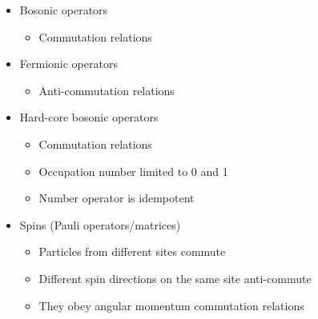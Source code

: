 \begin{frame}[t]
        \begin{minipage}[t]{0.5\textwidth}
            \vspace{0pt}
            \begin{itemize}
                \item Bosonic operators
                \begin{itemize}
                    \item Commutation relations
                \end{itemize}
                \item Fermionic operators
                \begin{itemize}
                    \item Anti-commutation relations
                \end{itemize}
                \item Hard-core bosonic operators
                \begin{itemize}
                    \item Commutation relations
                    \item Occupation number limited to 0 and 1
                    \item Number operator is idempotent
                \end{itemize}
                \item Spins (Pauli operators/matrices)\pause
                \begin{itemize}
                    \item Particles from different sites commute
                    \item Different spin directions on the same site anti-commute
                    \item They obey angular momentum commutation relations
                \end{itemize}
            \end{itemize}
        \end{minipage}%
        \onslide
        \hfill
        \begin{minipage}[t]{0.45\textwidth}
            \vspace{-1.0cm}
\end{minipage}
\end{frame}
